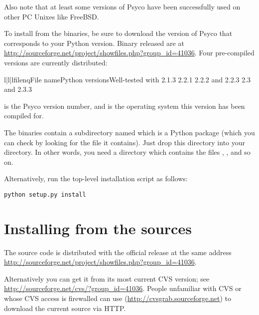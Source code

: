 \documentclass{manual}
\begin{document}
 Also note that at least some versions of Psyco have been successfully used on other PC Unixes like FreeBSD.

To install from the binaries, be sure to download the version of Psyco that corresponds to your Python version.  Binary released are at \url{http://sourceforge.net/project/showfiles.php?group_id=41036}.  Four pre-compiled versions are currently distributed:

\begin{tableiii}{l|l|l}{filenq}{File name}{Python versions}{Well-tested with}
         {2.1.3}
     {2.2.1}
             {2.2.2 and 2.2.3}
               {2.3 and 2.3.3}
\end{tableiii}

 is the Psyco version number, and  is the operating system this version has been compiled for.

The binaries contain a subdirectory named  which is a Python package (which you can check by looking for the  file it contains).  Just drop this directory into your  directory.  In other words, you need a directory  which contains the files , , and so on.

Alternatively, run the top-level installation script  as follows:

\begin{verbatim}
python setup.py install
\end{verbatim}


\section{Installing from the sources}\label{sources}

The source code is distributed with the official release at the same address \url{http://sourceforge.net/project/showfiles.php?group_id=41036}.

Alternatively you can get it from its most current CVS version; see \url{http://sourceforge.net/cvs/?group_id=41036}. People unfamiliar with CVS or whose CVS access is firewalled can use  (\url{http://cvsgrab.sourceforge.net}) to download the current source via HTTP.
\end{document}

